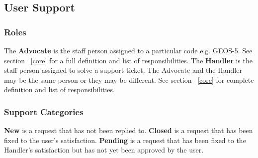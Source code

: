 \subsection{User Support}
\label{sec:usr_support}

\subsubsection{Roles}
The {\bf Advocate} is the staff person assigned to a particular code e.g. GEOS-5. See section ~\ref{core} for a full definition and list of responsibilities. 
The {\bf Handler} is the staff person assigned to solve a support ticket. The Advocate and the Handler may be the same person or they may be different. See section ~\ref{core} for complete definition and list of responsibilities.

\subsubsection{Support Categories}
{\bf New} is a request that has not been replied to.
{\bf Closed} is a request that has been fixed to the user's satisfaction.
{\bf Pending} is a request that has been fixed to the Handler's satisfaction but has not yet been approved by the user.

